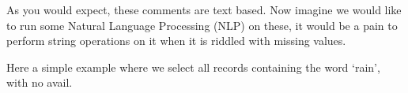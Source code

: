 \documentclass[letterpaper,10pt,english]{jupyterBook}
\begin{document}
\sphinxAtStartPar
As you would expect, these comments are text based. Now imagine we would like to run some Natural Language Processing (NLP) on these, it would be a pain to perform string operations on it when it is riddled with missing values.

\sphinxAtStartPar
Here a simple example where we select all records containing the word ‘rain’, with no avail.

\begin{sphinxVerbatim}[commandchars=\\\{\}]
\PYG{p}{[}\PYG{p}{]}
\end{sphinxVerbatim}
\end{document}
